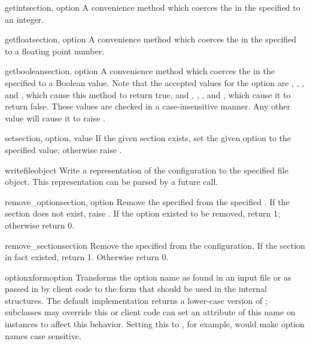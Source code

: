 \begin{methoddesc}{getint}{section, option}
A convenience method which coerces the  in the specified
 to an integer.
\end{methoddesc}

\begin{methoddesc}{getfloat}{section, option}
A convenience method which coerces the  in the specified
 to a floating point number.
\end{methoddesc}

\begin{methoddesc}{getboolean}{section, option}
A convenience method which coerces the  in the specified
 to a Boolean value.  Note that the accepted values
for the option are , , , and ,
which cause this method to return true, and , ,
, and , which cause it to return false.  These
values are checked in a case-insensitive manner.  Any other value will
cause it to raise .
\end{methoddesc}

\begin{methoddesc}{set}{section, option, value}
If the given section exists, set the given option to the specified value;
otherwise raise .
\end{methoddesc}

\begin{methoddesc}{write}{fileobject}
Write a representation of the configuration to the specified file
object.  This representation can be parsed by a future 
call.
\end{methoddesc}

\begin{methoddesc}{remove_option}{section, option}
Remove the specified  from the specified .
If the section does not exist, raise . 
If the option existed to be removed, return 1; otherwise return 0.
\end{methoddesc}

\begin{methoddesc}{remove_section}{section}
Remove the specified  from the configuration.
If the section in fact existed, return 1.  Otherwise return 0.
\end{methoddesc}

\begin{methoddesc}{optionxform}{option}
Transforms the option name  as found in an input file or
as passed in by  client code to the form that should be used in the
internal structures.  The default implementation returns a lower-case
version of ; subclasses may override this or client code
can set an attribute of this name on instances to affect this
behavior.  Setting this to , for example, would make
option names case sensitive.
\end{methoddesc}
